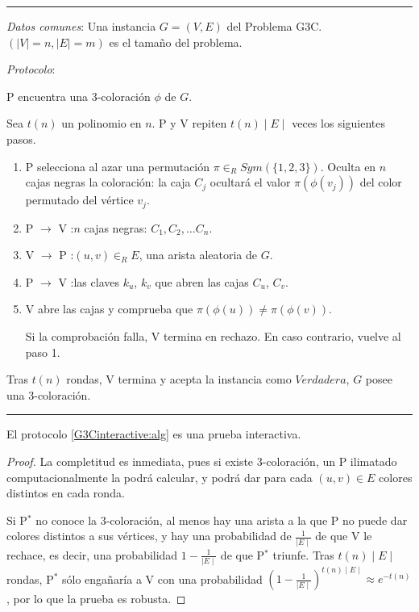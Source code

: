 \rule{\textwidth}{1pt}
\begin{algorithm}
	
	\hfil
	
	\textit{Datos comunes}: Una instancia $G=(V,E)$ del Problema G3C. $(\mid V \mid = n, \mid E \mid=m)$ es el tamaño del problema.
	
	\textit{Protocolo}: 
	
	P encuentra una 3-coloración $\phi$ de $G$.
	
	Sea $t(n)$ un polinomio en $n$. P y V repiten $t(n)\mid E \mid$ veces los siguientes pasos.
	
	\begin{enumerate}
		
		\item P selecciona al azar una permutación $\pi \in_R Sym(\{1,2,3\})$. Oculta en $n$ cajas negras la coloración: la caja $C_j$ ocultará el valor $\pi(\phi(v_j))$ del color permutado del vértice $v_j$.
		
		\item P $\rightarrow$ V :\quad $n$ cajas negras: $C_1, C_2, \dots C_n$.
		
		\item V $\rightarrow$ P :\quad $(u,v) \in_R E$, una arista aleatoria de $G$.
		
		\item P $\rightarrow$ V :\quad las claves $k_u$, $k_v$ que abren las cajas $C_u$, $C_v$.
		
		\item V abre las cajas y comprueba que $\pi(\phi(u)) \neq \pi(\phi(v))$.
		
		Si la comprobación falla, V termina en rechazo. En caso contrario, vuelve al paso 1.
		
		
	\end{enumerate}
	
	Tras $t(n)$ rondas, V termina y acepta la instancia como $Verdadera$, $G$ posee una 3-coloración.
	\label{G3Cinteractive:alg}
\end{algorithm}
\rule{\textwidth}{1pt}

\hfil



\begin{theorem}
	El protocolo \ref{G3Cinteractive:alg} es una prueba interactiva.
\end{theorem}

\begin{proof}
	La completitud es inmediata, pues si existe 3-coloración, un P ilimatado computacionalmente la podrá calcular, y podrá dar para cada $(u,v)\in E$ colores distintos en cada ronda.
	
	Si P$^*$ no conoce la 3-coloración, al menos hay una arista a la que P no puede dar colores distintos a sus vértices, y hay una probabilidad de $\frac{1}{\mid E \mid}$ de que V le rechace, es decir, una probabilidad $1-\frac{1}{\mid E \mid}$ de que P$^*$ triunfe. Tras $t(n)\mid E \mid$ rondas, P$^*$ sólo engañaría a V con una probabilidad $(1-\frac{1}{\mid E \mid})^{t(n)\mid E \mid} \approx e^{-t(n)}$, por lo que la prueba es robusta.
	
\end{proof}


